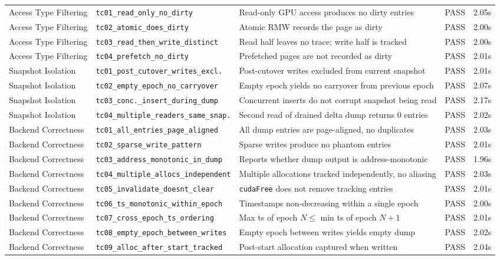 \begin{center}
\begin{longtable}{>{\raggedright\arraybackslash}p{2.0cm} >{\raggedright\arraybackslash}p{4.5cm} >{\raggedright\arraybackslash}p{6.2cm} >{\raggedright\arraybackslash}p{1.0cm} >{\raggedright\arraybackslash}p{1.1cm}}
Access Type Filtering & \texttt{tc01\_read\_only\_no\_dirty} & Read-only GPU access produces no dirty entries & PASS & 2.05s \\
Access Type Filtering & \texttt{tc02\_atomic\_does\_dirty} & Atomic RMW records the page as dirty & PASS & 2.00s \\
Access Type Filtering & \texttt{tc03\_read\_then\_write\_distinct} & Read half leaves no trace; write half is tracked & PASS & 2.00s \\
Access Type Filtering & \texttt{tc04\_prefetch\_no\_dirty} & Prefetched pages are not recorded as dirty & PASS & 2.01s \\
\midrule

Snapshot Isolation & \texttt{tc01\_post\_cutover\_writes\_excl.} & Post-cutover writes excluded from current snapshot & PASS & 2.01s \\
Snapshot Isolation & \texttt{tc02\_empty\_epoch\_no\_carryover} & Empty epoch yields no carryover from previous epoch & PASS & 2.07s \\
Snapshot Isolation & \texttt{tc03\_conc.\_insert\_during\_dump} & Concurrent inserts do not corrupt snapshot being read & PASS & 2.17s \\
Snapshot Isolation & \texttt{tc04\_multiple\_readers\_same\_snap.} & Second read of drained delta dump returns 0 entries & PASS & 2.02s \\
\midrule

Backend Correctness & \texttt{tc01\_all\_entries\_page\_aligned} & All dump entries are page-aligned, no duplicates & PASS & 2.03s \\
Backend Correctness & \texttt{tc02\_sparse\_write\_pattern} & Sparse writes produce no phantom entries & PASS & 2.01s \\
Backend Correctness & \texttt{tc03\_address\_monotonic\_in\_dump} & Reports whether dump output is address-monotonic & PASS & 1.96s \\
Backend Correctness & \texttt{tc04\_multiple\_allocs\_independent} & Multiple allocations tracked independently, no aliasing & PASS & 2.03s \\
Backend Correctness & \texttt{tc05\_invalidate\_doesnt\_clear} & \texttt{cudaFree} does not remove tracking entries & PASS & 2.01s \\
Backend Correctness & \texttt{tc06\_ts\_monotonic\_within\_epoch} & Timestamps non-decreasing within a single epoch & PASS & 2.00s \\
Backend Correctness & \texttt{tc07\_cross\_epoch\_ts\_ordering} & Max ts of epoch $N \leq$ min ts of epoch $N\!+\!1$ & PASS & 2.01s \\
Backend Correctness & \texttt{tc08\_empty\_epoch\_between\_writes} & Empty epoch between writes yields empty dump & PASS & 2.02s \\
Backend Correctness & \texttt{tc09\_alloc\_after\_start\_tracked} & Post-start allocation captured when written & PASS & 2.04s \\
\midrule


\end{longtable}
\end{center}
